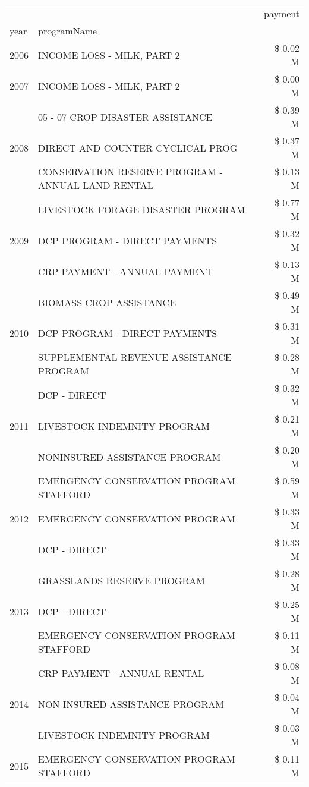 \begin{tabular}{llr}
\toprule
 &  & payment \\
year & programName &  \\
\midrule
2006 & INCOME LOSS - MILK, PART 2 & \$ 0.02 M \\
\cline{1-3}
2007 & INCOME LOSS - MILK, PART 2 & \$ 0.00 M \\
\cline{1-3}
\multirow[t]{3}{*}{2008} & 05 - 07 CROP DISASTER ASSISTANCE & \$ 0.39 M \\
 & DIRECT AND COUNTER CYCLICAL PROG & \$ 0.37 M \\
 & CONSERVATION RESERVE PROGRAM - ANNUAL LAND RENTAL & \$ 0.13 M \\
\cline{1-3}
\multirow[t]{3}{*}{2009} & LIVESTOCK FORAGE DISASTER  PROGRAM & \$ 0.77 M \\
 & DCP PROGRAM - DIRECT PAYMENTS & \$ 0.32 M \\
 & CRP PAYMENT - ANNUAL PAYMENT & \$ 0.13 M \\
\cline{1-3}
\multirow[t]{3}{*}{2010} & BIOMASS CROP ASSISTANCE & \$ 0.49 M \\
 & DCP PROGRAM - DIRECT PAYMENTS & \$ 0.31 M \\
 & SUPPLEMENTAL REVENUE ASSISTANCE PROGRAM & \$ 0.28 M \\
\cline{1-3}
\multirow[t]{3}{*}{2011} & DCP - DIRECT & \$ 0.32 M \\
 & LIVESTOCK INDEMNITY PROGRAM & \$ 0.21 M \\
 & NONINSURED ASSISTANCE PROGRAM & \$ 0.20 M \\
\cline{1-3}
\multirow[t]{3}{*}{2012} & EMERGENCY CONSERVATION PROGRAM STAFFORD & \$ 0.59 M \\
 & EMERGENCY CONSERVATION PROGRAM & \$ 0.33 M \\
 & DCP - DIRECT & \$ 0.33 M \\
\cline{1-3}
\multirow[t]{3}{*}{2013} & GRASSLANDS RESERVE PROGRAM & \$ 0.28 M \\
 & DCP - DIRECT & \$ 0.25 M \\
 & EMERGENCY CONSERVATION PROGRAM STAFFORD & \$ 0.11 M \\
\cline{1-3}
\multirow[t]{3}{*}{2014} & CRP PAYMENT - ANNUAL RENTAL & \$ 0.08 M \\
 & NON-INSURED ASSISTANCE PROGRAM & \$ 0.04 M \\
 & LIVESTOCK INDEMNITY PROGRAM & \$ 0.03 M \\
\cline{1-3}
\multirow[t]{3}{*}{2015} & EMERGENCY CONSERVATION PROGRAM STAFFORD & \$ 0.11 M \\

\end{tabular}

